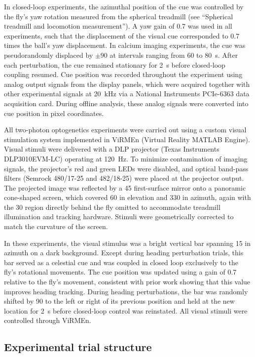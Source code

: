 In closed-loop experiments, the azimuthal position of the cue was controlled by the fly's yaw rotation measured from the spherical treadmill (see ``Spherical treadmill and locomotion measurement''). A yaw gain of 0.7 was used in all experiments, such that the displacement of the visual cue corresponded to 0.7 times the ball's yaw displacement. In calcium imaging experiments, the cue was pseudorandomly displaced by $\pm 90$\textdegree{} at intervals ranging from 60 to 80~s. After each perturbation, the cue remained stationary for 2~s before closed-loop coupling resumed. Cue position was recorded throughout the experiment using analog output signals from the display panels, which were acquired together with other experimental signals at 20~kHz via a National Instruments PCIe-6363 data acquisition card. During offline analysis, these analog signals were converted into cue position in pixel coordinates.

All two-photon optogenetics experiments were carried out using a custom visual stimulation system implemented in ViRMEn (Virtual Reality MATLAB Engine). Visual stimuli were delivered with a DLP projector (Texas Instruments DLP3010EVM-LC) operating at 120~Hz. To minimize contamination of imaging signals, the projector's red and green LEDs were disabled, and optical band-pass filters (Semrock 480/17-25 and 482/18-25) were placed at the projector output. The projected image was reflected by a 45\textdegree{} first-surface mirror onto a panoramic cone-shaped screen, which covered 60\textdegree{} in elevation and 330\textdegree{} in azimuth, again with the 30\textdegree{} region directly behind the fly omitted to accommodate treadmill illumination and tracking hardware. Stimuli were geometrically corrected to match the curvature of the screen.

In these experiments, the visual stimulus was a bright vertical bar spanning 15\textdegree{} in azimuth on a dark background. Except during heading perturbation trials, this bar served as a celestial cue and was coupled in closed loop exclusively to the fly's rotational movements. The cue position was updated using a gain of 0.7 relative to the fly's movement, consistent with prior work showing that this value improves heading tracking. During heading perturbations, the bar was randomly shifted by 90\textdegree{} to the left or right of its previous position and held at the new location for 2~s before closed-loop control was reinstated. All visual stimuli were controlled through ViRMEn.

\subsection{Experimental trial structure}

